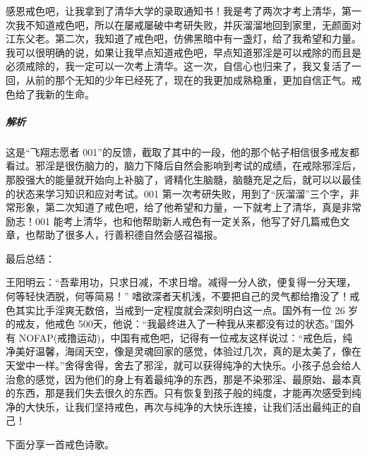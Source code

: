 \begin{case}
    感恩戒色吧，让我拿到了清华大学的录取通知书！我是考了两次才考上清华，第一次我不知道戒色吧，所以在屡戒屡破中考研失败，并灰溜溜地回到家里，无颜面对江东父老。第二次，我知道了戒色吧，仿佛黑暗中有一盏灯，给了我希望和力量。我可以很明确的说，如果让我早点知道戒色吧，早点知道邪淫是可以戒除的而且是必须戒除的，我一定可以一次考上清华。这一次，自信心也归来了，我又复活了一回，从前的那个无知的少年已经死了，现在的我更加成熟稳重，更加自信正气。戒色给了我新的生命。
    \subparagraph{解析} 这是“飞翔志愿者 001”的反馈，截取了其中的一段，他的那个帖子相信很多戒友都看过。邪淫是很伤脑力的，脑力下降后自然会影响到考试的成绩，在戒除邪淫后，那股强大的能量就开始向上补脑了，肾精化生脑髓，脑髓充足之后，就可以以最佳的状态来学习知识和应对考试。001 第一次考研失败，用到了“灰溜溜”三个字，非常形象，第二次知道了戒色吧，给了他希望和力量，一下就考上了清华，真是非常励志！001 能考上清华，也和他帮助新人戒色有一定关系，他写了好几篇戒色文章，也帮助了很多人，行善积德自然会感召福报。
\end{case}

最后总结：

王阳明云：“吾辈用功，只求日减，不求日增。减得一分人欲，便复得一分天理，何等轻快洒脱，何等简易！” 嗜欲深者天机浅，不要把自己的灵气都给撸没了！戒色其实比手淫爽无数倍，当戒到一定程度就会深刻明白这一点。国外有一位 26 岁的戒友，他戒色 500天，他说：“我最终进入了一种我从来都没有过的状态。”国外有 NOFAP(戒撸运动)，中国有戒色吧，记得有一位戒友这样说过：“戒色后，纯净美好温馨，海阔天空，像是灵魂回家的感觉，体验过几次，真的是太美了，像在天堂中一样。”舍得舍得，舍去了邪淫，就可以获得纯净的大快乐。小孩子总会给人治愈的感觉，因为他们的身上有着最纯净的东西，那是不染邪淫、最原始、最本真的东西，那是我们失去很久的东西。只有恢复到孩子般的纯度，才能再次感受到纯净的大快乐，让我们坚持戒色，再次与纯净的大快乐连接，让我们活出最纯正的自己！

下面分享一首戒色诗歌。

